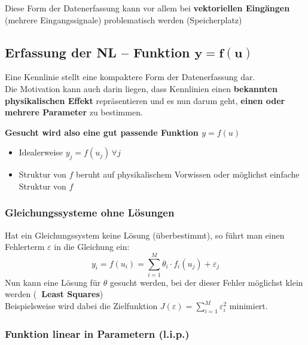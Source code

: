 \vspace{0.2cm}

Diese Form der Datenerfassung kann vor allem bei \textbf{vektoriellen Eingängen} (mehrere Eingangssignale) problematisch werden (Speicherplatz)


\subsection[Erfassung der NL -- Funktion]{Erfassung der NL -- Funktion $\bm{y = f(u)}$}

Eine Kennlinie stellt eine kompaktere Form der Datenerfassung dar. \\
Die Motivation kann auch darin liegen, dass Kennlinien einen \textbf{bekannten physikalischen Effekt} repräsentieren und es nun darum geht,
\textbf{einen oder mehrere Parameter} zu bestimmen.

\vspace{0.2cm}

\textbf{Gesucht wird also eine \textbf{gut passende Funktion} $y = f(u)$}

\vspace{0.1cm}

\begin{itemize}
	\item Idealerweise $y_j = f(u_j) \, \forall j$
	\item Struktur von $f$ beruht auf physikalischem Vorwissen oder möglichst einfache Struktur von $f$
\end{itemize}


\subsubsection{Gleichungssysteme ohne Lösungen}

Hat ein Gleichungssystem keine Lösung (überbestimmt), so führt man einen Fehlerterm $\varepsilon$ in die Gleichung ein:
$$ y_i = f(u_i) = \sum\limits_{i=1}^M \theta_i \cdot f_i(u_j) + \varepsilon_j $$
Nun kann eine Lösung für $\theta$ gesucht werden, bei der dieser Fehler möglichst klein werden (\textbf{\textrightarrow\ Least Squares}) \\
Beispielsweise wird dabei die Zielfunktion $J(\varepsilon) =  \sum\limits_{i=1}^M \varepsilon_i^2$ minimiert.


\subsubsection{Funktion linear in Parametern (l.i.p.)}

